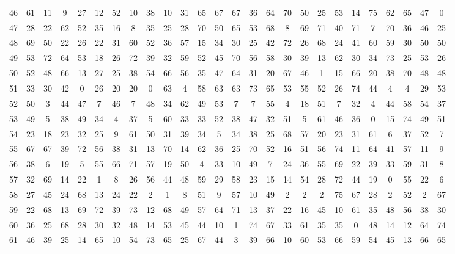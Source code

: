 \begin{table}
\begin{tabular}{c c c c c c c c c c c c c c c c c c c c c c c c c c }
46 & 61 & 11 & 9 & 27 & 12 & 52 & 10 & 38 & 10 & 31 & 65 & 67 & 67 & 36 & 64 & 70 & 50 & 25 & 53 & 14 & 75 & 62 & 65 & 47 & 0 \\
47 & 28 & 22 & 62 & 52 & 35 & 16 & 8 & 35 & 25 & 28 & 70 & 50 & 65 & 53 & 68 & 8 & 69 & 71 & 40 & 71 & 7 & 70 & 36 & 46 & 25 \\
48 & 69 & 50 & 22 & 26 & 22 & 31 & 60 & 52 & 36 & 57 & 15 & 34 & 30 & 25 & 42 & 72 & 26 & 68 & 24 & 41 & 60 & 59 & 30 & 50 & 50 \\
49 & 53 & 72 & 64 & 53 & 18 & 26 & 72 & 39 & 32 & 59 & 52 & 45 & 70 & 56 & 58 & 30 & 39 & 13 & 62 & 30 & 34 & 73 & 25 & 53 & 26 \\
50 & 52 & 48 & 66 & 13 & 27 & 25 & 38 & 54 & 66 & 56 & 35 & 47 & 64 & 31 & 20 & 67 & 46 & 1 & 15 & 66 & 20 & 38 & 70 & 48 & 48 \\
51 & 33 & 30 & 42 & 0 & 26 & 20 & 20 & 0 & 63 & 4 & 58 & 63 & 63 & 73 & 65 & 53 & 55 & 52 & 26 & 74 & 44 & 4 & 4 & 29 & 53 \\
52 & 50 & 3 & 44 & 47 & 7 & 46 & 7 & 48 & 34 & 62 & 49 & 53 & 7 & 7 & 55 & 4 & 18 & 51 & 7 & 32 & 4 & 44 & 58 & 54 & 37 \\
53 & 49 & 5 & 38 & 49 & 34 & 4 & 37 & 5 & 60 & 33 & 33 & 52 & 38 & 47 & 32 & 51 & 5 & 61 & 46 & 36 & 0 & 15 & 74 & 49 & 51 \\
54 & 23 & 18 & 23 & 32 & 25 & 9 & 61 & 50 & 31 & 39 & 34 & 5 & 34 & 38 & 25 & 68 & 57 & 20 & 23 & 31 & 61 & 6 & 37 & 52 & 7 \\
55 & 67 & 67 & 39 & 72 & 56 & 38 & 31 & 13 & 70 & 14 & 62 & 36 & 25 & 70 & 52 & 16 & 51 & 56 & 74 & 11 & 64 & 41 & 57 & 11 & 9 \\
56 & 38 & 6 & 19 & 5 & 55 & 66 & 71 & 57 & 19 & 50 & 4 & 33 & 10 & 49 & 7 & 24 & 36 & 55 & 69 & 22 & 39 & 33 & 59 & 31 & 8 \\
57 & 32 & 69 & 14 & 22 & 1 & 8 & 26 & 56 & 44 & 48 & 59 & 29 & 58 & 23 & 15 & 14 & 54 & 28 & 72 & 44 & 19 & 0 & 55 & 22 & 6 \\
58 & 27 & 45 & 24 & 68 & 13 & 24 & 22 & 2 & 1 & 8 & 51 & 9 & 57 & 10 & 49 & 2 & 2 & 2 & 75 & 67 & 28 & 2 & 52 & 2 & 67 \\
59 & 22 & 68 & 13 & 69 & 72 & 39 & 73 & 12 & 68 & 49 & 57 & 64 & 71 & 13 & 37 & 22 & 16 & 45 & 10 & 61 & 35 & 48 & 56 & 38 & 30 \\
60 & 36 & 25 & 68 & 28 & 30 & 32 & 48 & 14 & 53 & 45 & 44 & 10 & 1 & 74 & 67 & 33 & 61 & 35 & 35 & 0 & 48 & 14 & 12 & 64 & 74 \\
61 & 46 & 39 & 25 & 14 & 65 & 10 & 54 & 73 & 65 & 25 & 67 & 44 & 3 & 39 & 66 & 10 & 60 & 53 & 66 & 59 & 54 & 45 & 13 & 66 & 65 \\

\end{tabular}
\end{table}
